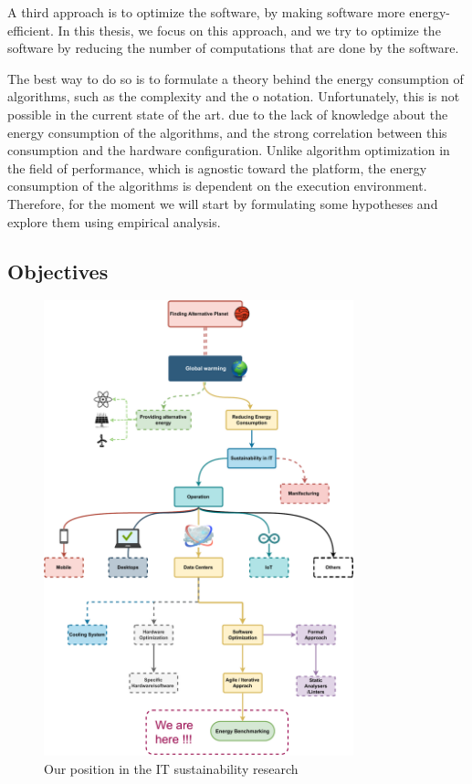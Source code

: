 A third approach is to optimize the software, by making software more energy-efficient. In this thesis, we focus on this approach, and we try to optimize the software by reducing the number of computations that are done by the software. 

The best way to do so is to formulate a theory behind the energy consumption of algorithms, such as the complexity and the o notation.
Unfortunately, this is not possible in the current state of the art. due to the lack of knowledge about the energy consumption of the algorithms, and the strong correlation between this consumption and the hardware configuration.
Unlike algorithm optimization in the field of performance, which is agnostic toward the platform, the energy consumption of the algorithms is dependent on the execution environment.
Therefore, for the moment we will start by formulating some hypotheses and explore them using empirical analysis.



\subsection*{Objectives}






\begin{figure}[!h]
    \caption{Our position in the IT sustainability research}
    \label{fig:thesis_position}
    \includegraphics[width=0.8\textwidth,height=\textheight,keepaspectratio]{chapters/thesis_position.pdf}
\end{figure}



